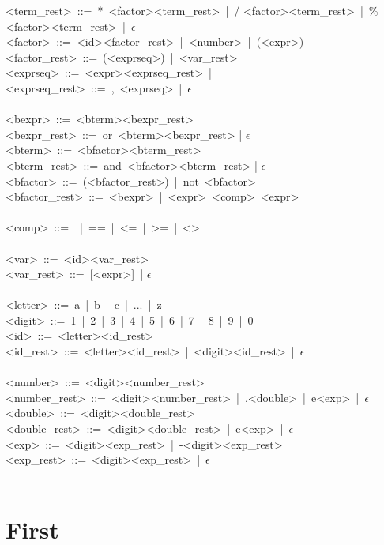 \documentclass{article}
\begin{document}
<term\_rest>\ ::=\ *\ <factor><term\_rest>\ |\ / <factor><term\_rest>\ |\ \% <factor><term\_rest>\ |\ $\epsilon$\\
<factor>\ ::=\ <id><factor\_rest>\ |\ <number>\ |\ (<expr>)\\
<factor\_rest>\ ::=\ (<exprseq>)\ |\ <var\_rest>\\
<exprseq>\ ::=\ <expr><exprseq\_rest>\ | \\
<exprseq\_rest>\ ::=\ ,\ <exprseq>\ |\ $\epsilon$\\
\\
<bexpr>\ ::=\ <bterm><bexpr\_rest>\\
<bexpr\_rest>\ ::=\ or\ <bterm><bexpr\_rest> | $\epsilon$ \\
<bterm>\ ::=\ <bfactor><bterm\_rest>\\
<bterm\_rest>\ ::=\ and\ <bfactor><bterm\_rest> | $\epsilon$\\
<bfactor>\ ::=\ (<bfactor\_rest>)\ |\ not\ <bfactor>\\
<bfactor\_rest>\ ::=\ <bexpr>\ |\ <expr>\ <comp>\ <expr>\\
\\
<comp>\ ::=\ < | >\ |\ ==\ |\ <=\ |\ >=\ |\ <>\\
\\
<var>\ ::=\ <id><var\_rest>\\
<var\_rest>\ ::=\ [<expr>]\ | $\epsilon$\\
\\
<letter>\ ::=\ a\ |\ b\ |\ c\ |\ ...\ |\ z\\
<digit>\ ::=\ 1\ |\ 2\ |\ 3\ |\ 4\ |\ 5\ |\ 6\ |\ 7\ |\ 8\ |\ 9\ |\ 0\\
<id>\ ::=\ <letter><id\_rest>\\
<id\_rest>\ ::=\ <letter><id\_rest>\ |\ <digit><id\_rest>\ |\ $\epsilon$\\
\\
<number>\ ::=\ <digit><number\_rest>\\
<number\_rest>\ ::=\ <digit><number\_rest>\ |\ .<double>\ |\ e<exp>\ |\ $\epsilon$\\
<double>\ ::=\ <digit><double\_rest>\\
<double\_rest>\ ::=\ <digit><double\_rest>\ |\ e<exp>\ |\ $\epsilon$\\
<exp>\ ::=\ <digit><exp\_rest>\ |\ -<digit><exp\_rest>\\
<exp\_rest>\ ::=\ <digit><exp\_rest>\ |\ $\epsilon$\\
\\

\noindent
\section*{First}
\end{document}
